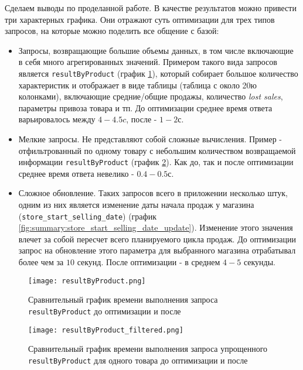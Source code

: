 \label{sec:summary}

Сделаем выводы по проделанной работе. В качестве результатов можно привести три характерных графика. Они отражают суть оптимизации для трех типов запросов, на которые можно поделить все общение с базой:

\begin{itemize}
  \item Запросы, возвращающие большие объемы данных, в том числе включающие в себя много агрегированных значений. Примером такого вида запросов является \lstinline{resultByProduct} (график \ref{fig:summary:result_by_product}), который собирает большое количество характеристик и отображает в виде таблицы (таблица с около 20ю колонками), включающие средние/общие продажы, количество \emph{lost sales}, параметры привоза товара и тп. До оптимизации среднее время ответа варьировалось между $4-4.5 c$, после - $1-2 с$.
  \item Мелкие запросы. Не представляют собой сложные вычисления. Пример - отфильтрованный по одному товару с небольшим количеством возвращаемой информации \lstinline{resultByProduct} (график \ref{fig:summary:result_by_product_filtered}). Как до, так и после оптимизации среднее время ответа невелико - $0.4-0.5 с$.
  \item Сложное обновление. Таких запросов всего в приложении несколько штук, одним из них является изменение даты начала продаж у магазина (\lstinline{store_start_selling_date}) (график \ref{fig:summary:store_start_selling_date_update}). Изменение этого значения влечет за собой пересчет всего планируемого цикла продаж. До оптимизации запрос на обновление этого параметра для выбранного магазина отрабатывал более чем за $10$ секунд. После оптимизации - в среднем $4-5$ секунды.
\end{itemize}

\begin{figure}
	\centering
	\texttt{[image: resultByProduct.png]}
	\caption{Сравнительный график времени выполнения запроса \lstinline{resultByProduct} до оптимизации и после}
	\label{fig:summary:result_by_product}
\end{figure}

\begin{figure}
	\centering
	\texttt{[image: resultByProduct\_filtered.png]}
	\caption{Сравнительный график времени выполнения запроса упрощенного  \lstinline{resultByProduct} для одного товара до оптимизации и после}
	\label{fig:summary:result_by_product_filtered}
\end{figure}


